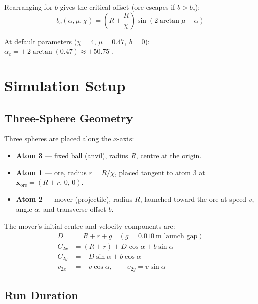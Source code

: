 \documentclass{article}
\begin{document}
Rearranging for $b$ gives the critical offset (ore escapes if $b > b_c$):
\begin{equation}
\boxed{
    b_c(\alpha,\mu,\chi) = \left(R + \frac{R}{\chi}\right)\sin(2\arctan\mu - \alpha)
}
\end{equation}

\noindent At default parameters ($\chi=4$, $\mu=0.47$, $b=0$):
$\alpha_c = \pm\,2\arctan(0.47) \approx \pm50.75^{\circ}$.

\section{Simulation Setup}
\label{sec:sim}

\subsection{Three-Sphere Geometry}

Three spheres are placed along the $x$-axis:
\begin{itemize}
    \item \textbf{Atom 3} — fixed ball (anvil), radius $R$, centre at the origin.
    \item \textbf{Atom 1} — ore, radius $r = R/\chi$, placed tangent to atom 3
          at $\mathbf{x}_{\text{ore}} = (R+r,\,0,\,0)$.
    \item \textbf{Atom 2} — mover (projectile), radius $R$, launched toward the
          ore at speed $v$, angle $\alpha$, and transverse offset $b$.
\end{itemize}

The mover's initial centre and velocity components are:
\begin{align}
    D        &= R + r + g \quad (g = 0.010\ \text{m launch gap}) \\[4pt]
    C_{2x}   &= (R+r) + D\cos\alpha + b\sin\alpha \\
    C_{2y}   &= -D\sin\alpha + b\cos\alpha \\[4pt]
    v_{2x}   &= -v\cos\alpha, \qquad v_{2y} = v\sin\alpha
\end{align}

\subsection{Run Duration}
\end{document}

